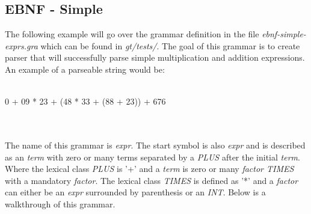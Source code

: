 \subsection{EBNF - Simple}

The following example will go over the grammar definition in the file \textit{ebnf-simple-exprs.gra} which can be found in 
\textit{gt/tests/}. The goal of this grammar is to create parser that will successfully parse simple
multiplication and addition expressions. An example of a parseable string would be:
\\\\
\begin{minipage}[t]{.8\linewidth}
0 + 09 * 23 + (48 * 33 + (88 + 23)) + 676 
\end{minipage}
\\\\
The name of this grammar is \textit{expr}. The start symbol is also \textit{expr} and is described as an 
\textit{term} with zero or many terms separated by a \textit{PLUS} after the initial \textit{term}. 
Where the lexical class \textit{PLUS} is '+' and a \textit{term} is zero or many \textit{factor TIMES} with a 
mandatory \textit{factor}. The lexical class \textit{TIMES} is defined as '*' and a \textit{factor} can either 
be an \textit{expr} surrounded by parenthesis or an \textit{INT}. Below is a walkthrough of this grammar.

